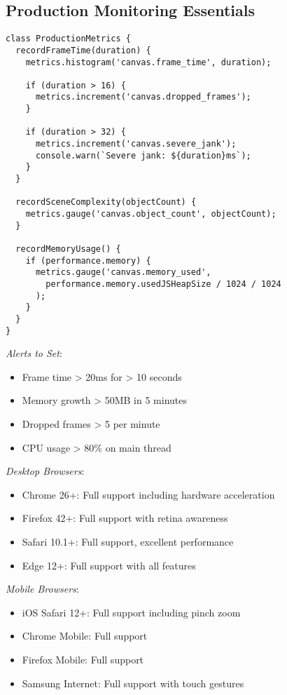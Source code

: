 \documentclass[11pt]{article}
\begin{document}
\subsection{Production Monitoring Essentials}
\label{sec:orgd2de08f}

\begin{verbatim}
class ProductionMetrics {
  recordFrameTime(duration) {
    metrics.histogram('canvas.frame_time', duration);
    
    if (duration > 16) {
      metrics.increment('canvas.dropped_frames');
    }
    
    if (duration > 32) {
      metrics.increment('canvas.severe_jank');
      console.warn(`Severe jank: ${duration}ms`);
    }
  }
  
  recordSceneComplexity(objectCount) {
    metrics.gauge('canvas.object_count', objectCount);
  }
  
  recordMemoryUsage() {
    if (performance.memory) {
      metrics.gauge('canvas.memory_used', 
        performance.memory.usedJSHeapSize / 1024 / 1024
      );
    }
  }
}
\end{verbatim}

\emph{Alerts to Set}:
\begin{itemize}
\item Frame time > 20ms for > 10 seconds
\item Memory growth > 50MB in 5 minutes
\item Dropped frames > 5 per minute
\item CPU usage > 80\% on main thread
\end{itemize}


\emph{Desktop Browsers}:

\begin{itemize}
\item Chrome 26+: Full support including hardware acceleration
\item Firefox 42+: Full support with retina awareness
\item Safari 10.1+: Full support, excellent performance
\item Edge 12+: Full support with all features
\end{itemize}

\emph{Mobile Browsers}:

\begin{itemize}
\item iOS Safari 12+: Full support including pinch zoom
\item Chrome Mobile: Full support
\item Firefox Mobile: Full support
\item Samsung Internet: Full support with touch gestures
\end{itemize}
\end{document}
